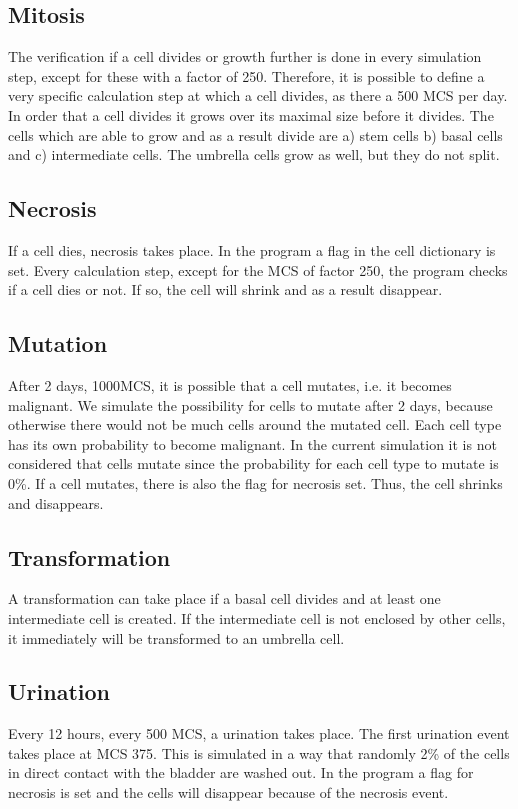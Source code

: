 \subsection{Mitosis}
The verification if a cell divides or growth further is done in every simulation step, except for these with a factor of 250. Therefore, it is possible to define a very specific calculation step at which a cell divides, as there a 500 \ac{MCS} per day. In order that a cell divides it grows over its maximal size before it divides.
The cells which are able to grow and as a result divide are a) stem cells b) basal cells and c) intermediate cells. The umbrella cells grow as well, but they do not split.

\subsection{Necrosis}
If a cell dies, necrosis takes place. In the program a flag in the cell dictionary is set. Every calculation step, except for the \ac{MCS} of factor 250, the program checks if a cell dies or not. If so, the cell will shrink and as a result disappear.

\subsection{Mutation}
After 2 days, 1000\ac{MCS}, it is possible that a cell mutates, i.e. it becomes malignant. We simulate the possibility for cells to mutate after 2 days, because otherwise there would not be much cells around the mutated cell. Each cell type has its own probability to become malignant. In the current simulation it is not considered that cells mutate since the probability for each cell type to mutate is 0\%. \newline
If a cell mutates, there is also the flag for necrosis set. Thus, the cell shrinks and disappears.

\subsection{Transformation}
A transformation can take place if a basal cell divides and at least one intermediate cell is created. If the intermediate cell is not enclosed by other cells, it immediately will be transformed to an umbrella cell.

\subsection{Urination}
Every 12 hours, every 500 \ac{MCS}, a urination takes place. The first urination event takes place at \ac{MCS} 375. This is simulated in a way that randomly 2\% of the cells in direct contact with the bladder are washed out. In the program a flag for necrosis is set and the cells will disappear because of the necrosis event.



